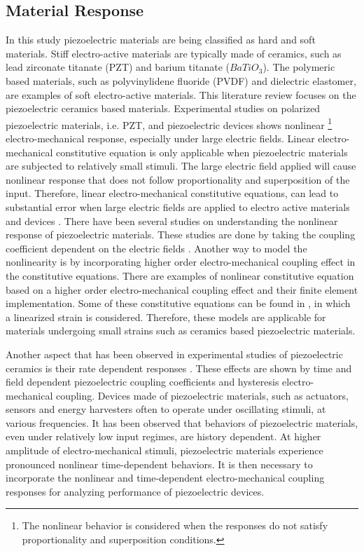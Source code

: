 \subsection{Material Response}
In this study piezoelectric materials are being classified as hard and soft materials. 
Stiff electro-active materials are typically made of ceramics, such as lead zirconate titanate (PZT) and barium titanate ($BaTiO_3$).
The polymeric based materials, such as polyvinylidene fluoride (PVDF) and dielectric elastomer, are examples of soft electro-active materials. 
This literature review focuses on the piezoelectric ceramics based materials. 
Experimental studies on polarized piezoelectric materials, i.e. PZT, and piezoelectric devices \cite{Crawley1990,Ardelean2004,anderson1989piezoceramic} shows nonlinear \footnote{The nonlinear behavior is considered when the responses do not satisfy proportionality and superposition conditions.} electro-mechanical response, especially under large electric fields. 
Linear electro-mechanical constitutive equation is only applicable when piezoelectric materials are subjected to relatively small stimuli.
The large electric field applied will cause nonlinear response that does not follow proportionality and superposition of the input.
Therefore, linear electro-mechanical constitutive equations, can lead to substantial error when large electric fields are applied to electro active 
materials and devices \cite{Hall2001}. 
There have been several studies on understanding the nonlinear response of piezoelectric materials.
These studies are done by taking the coupling coefficient dependent on the electric fields \cite{Crawley1990}.
Another way to model the nonlinearity is by incorporating higher order electro-mechanical coupling effect in the constitutive equations. 
There are examples of nonlinear constitutive equation based on a higher order electro-mechanical coupling effect and their finite element implementation.
Some of these constitutive equations can be found in \cite{Bassiouny19881297,tiersten1993electroelastic,Maugin2010,Muliana2011a,Sohrabi2011},
 in which a linearized strain is considered.
Therefore, these models are applicable for materials undergoing small strains such as ceramics based piezoelectric materials.

Another aspect that has been observed in experimental studies of piezoelectric ceramics is their rate dependent responses \cite{Zhou2010,Zhou2006}. 
These effects are shown by time and field dependent piezoelectric coupling coefficients and hysteresis electro-mechanical coupling. 
Devices made of piezoelectric materials, such as actuators, sensors and energy harvesters often to operate under oscillating stimuli, 
at various frequencies. 
It has been observed that behaviors of piezoelectric materials, even under relatively low input regimes, are history dependent\cite{Crawley1990,anderson1989piezoceramic}. 
At higher amplitude of electro-mechanical stimuli, piezoelectric materials experience pronounced nonlinear time-dependent behaviors. 
It is then necessary to incorporate the nonlinear and time-dependent electro-mechanical coupling responses for analyzing performance of piezoelectric devices.
 

